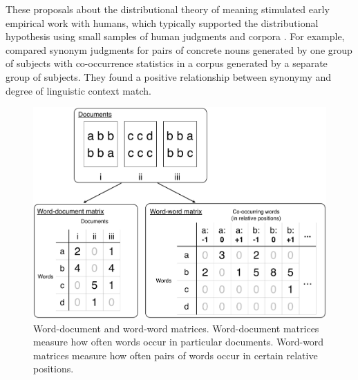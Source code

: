 \documentclass[man,floatsintext]{apa6}
\begin{document}
These proposals about the distributional theory of meaning stimulated early empirical work with humans, which typically supported the distributional hypothesis using small samples of human judgments and corpora \citep{rubenstein1965, clark1968, stefflre1971, geffroy1973, berryrogghe1973, szalay1974}. For example, \citet{rubenstein1965} compared synonym judgments for pairs of concrete nouns generated by one group of subjects with co-occurrence statistics in a corpus generated by a separate group of subjects. They found a positive relationship between synonymy and degree of linguistic context match.

\begin{figure}[t]
  \begin{center}
    \includegraphics[width=0.9\linewidth]{matrices}
  \end{center}
  \caption{Word-document and word-word matrices. Word-document matrices measure how often words occur in particular documents. Word-word matrices measure how often pairs of words occur in certain relative positions.}
  \label{matrices}
\end{figure}
\end{document}
